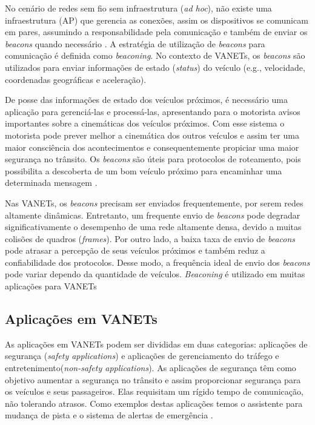 \documentclass[mestrado, pre-defesa, english, brazil]{packages/icmc}
\begin{document}
No cenário de redes sem fio sem infraestrutura (\textit{ad hoc}), não existe uma infraestrutura (AP) que gerencia as conexões, assim os dispositivos se comunicam em pares, assumindo a responsabilidade pela comunicação e também de enviar os \textit{beacons} quando necessário \cite{Kurose-2012}. A estratégia de utilização de \textit{beacons} para comunicação é definida como \textit{beaconing}. No contexto de VANETs, os \textit{beacons} são utilizados para enviar informações de estado (\textit{status}) do veículo (e.g., velocidade, coordenadas geográficas e aceleração). 

De posse das informações de estado dos veículos próximos, é necessário uma aplicação para gerenciá-las e processá-las, apresentando para o motorista avisos importantes sobre a cinemáticas dos veículos próximos. Com esse sistema o motorista pode prever melhor a cinemática dos outros veículos e assim ter uma maior consciência dos acontecimentos e consequentemente propiciar uma maior segurança no trânsito. Os \textit{beacons} são úteis para protocolos de roteamento, pois possibilita a descoberta de um bom veículo próximo para encaminhar uma determinada mensagem  \cite{noori-2013, Nguyen-2002,Fuentes-2011}.

Nas VANETs, os \textit{beacons} precisam ser enviados frequentemente, por serem redes altamente dinâmicas. Entretanto, um frequente envio de \textit{beacons} pode degradar significativamente o desempenho de uma rede altamente densa, devido a muitas colisões de quadros (\textit{frames}). Por outro lado, a baixa taxa de envio de \textit{beacons} pode atrasar a percepção de seus veículos próximos e também reduz a confiabilidade dos protocolos. Desse modo, a frequência ideal de envio dos \textit{beacons} pode variar dependo da quantidade de veículos. \textit{Beaconing} é utilizado em muitas aplicações para VANETs \cite{Nguyen-2002,Thaina-2011,noori-2013}

\subsection{Aplicações em VANETs} \label{apli_vanets}

As aplicações em VANETs podem ser divididas em duas categorias: aplicações de segurança (\textit{safety applications}) e aplicações de gerenciamento do tráfego e entretenimento(\textit{non-safety applications}). As aplicações de segurança têm como objetivo aumentar a segurança no trânsito e assim proporcionar segurança para os veículos e seus passageiros. Elas requisitam um rígido tempo de comunicação, não tolerando atrasos. Como exemplos destas aplicações temos o assistente para mudança de pista e o sistema de alertas de emergência \cite{aboobaker-2010, al-sultan-2014}.
\end{document}
